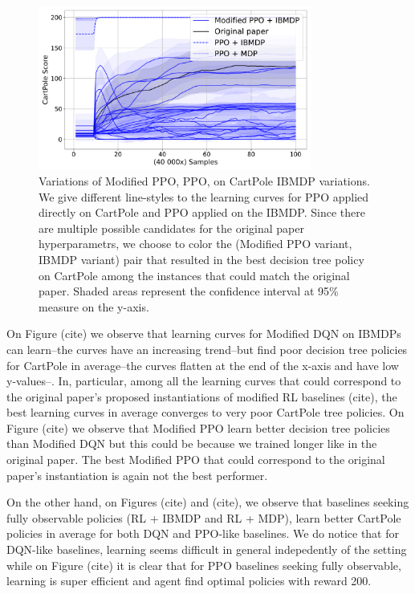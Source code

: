 \begin{figure}
    \centering
    \includegraphics[width=0.8\textwidth]{images/images_part1/ppo.pdf}
    \caption{Variations of Modified PPO, PPO, on CartPole IBMDP variations. We give different line-styles to the learning curves for PPO applied directly on CartPole and PPO applied on the IBMDP.
    Since there are multiple possible candidates for the original paper hyperparametrs, we choose to color the (Modified PPO variant, IBMDP variant) pair that resulted in the best decision tree policy on CartPole among the instances that could match the original paper.
    Shaded areas represent the confidence interval at 95\% measure on the y-axis.}
\end{figure}
On Figure (cite) we observe that learning curves for Modified DQN on IBMDPs can learn--the curves have an increasing trend--but find poor decision tree policies for CartPole in average--the curves flatten at the end of the x-axis and have low y-values--.
In, particular, among all the learning curves that could correspond to the original paper's proposed instantiations of modified RL baselines (cite), the best learning curves in average converges to very poor CartPole tree policies.
On Figure (cite) we observe that Modified PPO learn better decision tree policies than Modified DQN but this could be because we trained longer like in the original paper.
The best Modified PPO that could correspond to the original paper's instantiation is again not the best performer.

On the other hand, on Figures (cite) and (cite), we observe that baselines seeking fully observable policies (RL + IBMDP and RL + MDP), learn better CartPole policies in average for both DQN and PPO-like baselines. 
We do notice that for DQN-like baselines, learning seems difficult in general indepedently of the setting while on Figure (cite) it is clear that for PPO baselines seeking fully observable, learning is super efficient and agent find optimal policies with reward 200.

